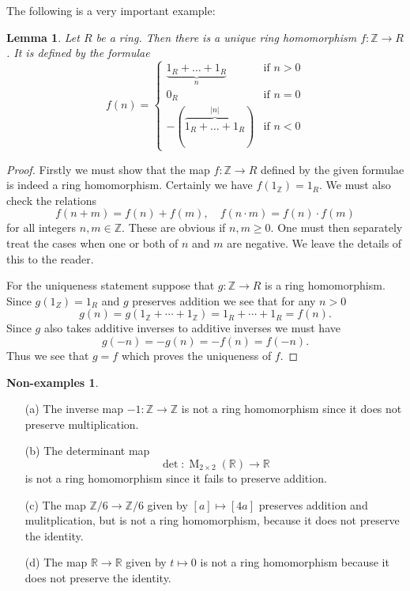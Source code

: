 \documentclass [12pt,oneside,a4paper,mathscr]{amsart}
\newtheorem{lemma}[thm]{Lemma}
\theoremstyle{definition}
\newtheorem{nonexamples}[thm]{Non-examples}
\newcommand {\C}{\mathbb C}
\renewcommand{\geq}{\geqslant}
\newcommand{\R}{\mathbb{R}}
\newcommand{\Z}{\mathbb Z}
\begin{document}
The following is a very important example:

\begin{lemma}
\label{map}
Let $R$ be a ring.  Then there is a unique ring homomorphism $f\colon \Z \to R$. It is defined by the formulae
\[f(n)=\left\{
\begin{array}{ll}
\underbrace{1_R+\dots+1_R}_{n \text{}} & \text{if } n>0\\
0_R &  \text{if } n=0\\
-(\overbrace{1_R+\dots+1_R}^{|n| \text{}}) & \text{if } n<0
\end{array}
\right.
\]
\end{lemma}

\begin{proof}
 Firstly we must show that the map $f\colon \Z \to R$ defined by the given formulae is indeed  a ring homomorphism. Certainly we have $f(1_\Z)=1_R$. We must also check the relations \[f(n+m)=f(n)+f(m), \quad f(n\cdot m)=f(n)\cdot f(m)\] for all integers $n,m\in \Z$. These are obvious  if $n,m\geq 0$. One must then separately  treat the cases when one or both of $n$ and $m$ are negative. We leave the details of this to the reader.

For the uniqueness statement suppose that $g\colon \Z \to R$ is a ring homomorphism. Since $g(1_Z)=1_R$ and $g$ preserves addition we see that for any $n>0$
\[g(n)=g(1_\Z+ \cdots + 1_\Z)=1_R + \cdots +1_R=f(n).\]
Since $g$ also takes additive inverses to additive inverses we must have \[g(-n)=-g(n)=-f(n)=f(-n).\] Thus we see that $g=f$ which proves the uniqueness of $f$. 
\end{proof}

\begin{nonexamples}
\begin{itemize}
\item[(a)] The inverse map $-1\colon \Z \to \Z$ is not a ring homomorphism since it does not preserve multiplication.
\smallskip
\item[(b)] The determinant map
\[\operatorname{det}\colon \operatorname{M}_{2\times 2}(\R) \to \R\]
is not a ring homomorphism since it fails to preserve addition.
\smallskip
\item[(c)] The map $\Z/6 \to \Z/6$ given by $[a]\mapsto [4a]$ preserves addition and mulitplication, but is not a ring homomorphism,  because it does not preserve the identity.
\smallskip
\item[(d)] The map $\R \to \R$ given by $t\mapsto 0$ is not a ring homomorphism because it does not preserve the identity.
\end{itemize}
\end{nonexamples}
\end{document}
